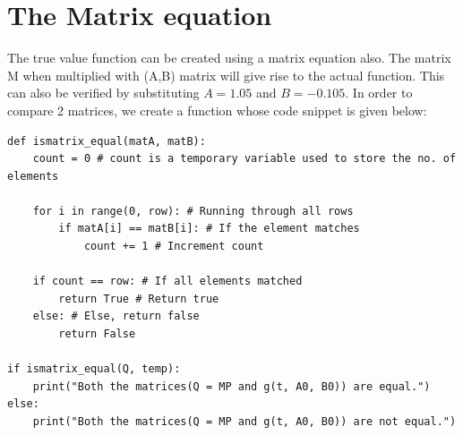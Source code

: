 \documentclass[11pt, a4paper]{article}
\begin{document}
\section{The Matrix equation}
The true value function can be created using a matrix equation also. The matrix M when multiplied with (A,B) matrix will give rise to the actual function. This can also be verified by substituting $A=1.05$ and $B=-0.105$. In order to compare 2 matrices, we create a function  whose code snippet is given below:
  \begin{verbatim}	
def ismatrix_equal(matA, matB):
    count = 0 # count is a temporary variable used to store the no. of elements
    
    for i in range(0, row): # Running through all rows
        if matA[i] == matB[i]: # If the element matches                       
            count += 1 # Increment count

    if count == row: # If all elements matched
        return True # Return true
    else: # Else, return false
        return False

if ismatrix_equal(Q, temp):
    print("Both the matrices(Q = MP and g(t, A0, B0)) are equal.")
else: 
    print("Both the matrices(Q = MP and g(t, A0, B0)) are not equal.")           
\end{verbatim} 
\end{document}
